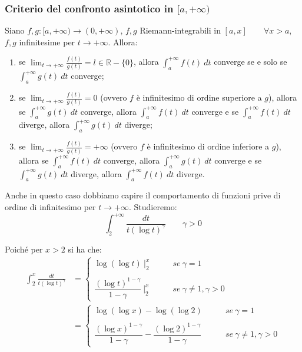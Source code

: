 \documentclass{article}
\begin{document}
\subsubsection{Criterio del confronto asintotico in $[a, +\infty)$}
Siano $f, g: [a, +\infty) \xrightarrow{} (0, +\infty)$, $f, g$ Riemann-integrabili in $[a, x] \qquad \forall x > a$, $f, g$ infinitesime per $t \to +\infty$. Allora:
\begin{enumerate}
    \item se $\lim_{t \to +\infty} \frac{f(t)}{g(t)} = l \in \mathbb{R} - \{0\}$, allora $\int_a^{+\infty} f(t) \ dt$ converge se e solo se $\int_a^{+\infty} g(t) \ dt$ converge;
    \item se $\lim_{t \to +\infty} \frac{f(t)}{g(t)} = 0$ (ovvero $f$ è infinitesimo di ordine superiore a $g$), allora se $\int_a^{+\infty} g(t) \ dt$ converge, allora $\int_a^{+\infty} f(t) \ dt$ converge e se $\int_a^{+\infty} f(t) \ dt$ diverge, allora $\int_a^{+\infty} g(t) \ dt$ diverge;
    \item se $\lim_{t \to +\infty} \frac{f(t)}{g(t)} = +\infty$ (ovvero $f$ è infinitesimo di ordine inferiore a $g$), allora se $\int_a^{+\infty} f(t) \ dt$ converge, allora $\int_a^{+\infty} g(t) \ dt$ converge e se $\int_a^{+\infty} g(t) \ dt$ diverge, allora $\int_a^{+\infty} f(t) \ dt$ diverge.
\end{enumerate}

\noindent Anche in questo caso dobbiamo capire il comportamento di funzioni prive di ordine di infinitesimo per $t \to +\infty$. Studieremo:
\begin{equation*}
    \int_2^{+\infty} \frac{dt}{t(\log t)^\gamma} \qquad \gamma > 0
\end{equation*}

\noindent Poiché per $x > 2$ si ha che:
\begin{align*}
    \int_2^x \frac{dt}{t(\log t)^\gamma} &= \begin{cases}
        \log(\log t) \ \bigg|_2^x & \qquad se \ \gamma = 1 \\ \\
        \dfrac{(\log t)^{1 - \gamma}}{1 - \gamma} \ \bigg|_2^x & \qquad se \ \gamma \neq 1, \gamma > 0
    \end{cases}\\
    &=
    \begin{cases}
        \log(\log x) - \log(\log 2) & \qquad se \ \gamma = 1 \\ \\
        \dfrac{(\log x)^{1 - \gamma}}{1 - \gamma} - \dfrac{(\log 2)^{1 - \gamma}}{1 - \gamma} & \qquad se \ \gamma \neq 1, \gamma > 0
    \end{cases}
\end{align*}
\end{document}
